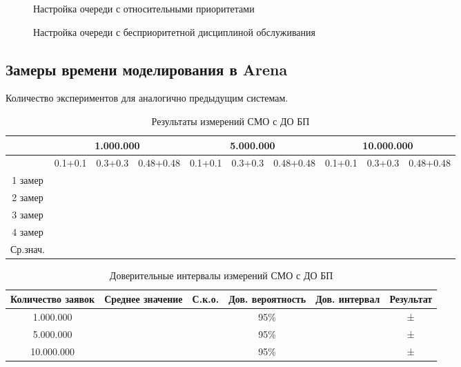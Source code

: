 \documentclass[a4paper,14pt]{report} %
\begin{document}
\begin{figure}[h] %
\caption{Настройка очереди с относительными приоритетами}
\label{ris:queue_pri}
\end{figure} %

\begin{figure}[h] %
\caption{Настройка очереди с бесприоритетной дисциплиной обслуживания}
\label{ris:queue}
\end{figure} %

\subsection{Замеры времени моделирования в Arena}
Количество экспериментов для аналогично предыдущим системам.

\begin{table}[h!]
\caption{Результаты измерений СМО с ДО БП}
\begin{tabular}{|c|c|c|c|c|c|c|c|c|c|}
\hline
 & \multicolumn{3}{|c|}{1.000.000} & \multicolumn{3}{|c|}{5.000.000} & \multicolumn{3}{|c|}{10.000.000} \\
\hline
 & 0.1+0.1 & 0.3+0.3 & 0.48+0.48 & 0.1+0.1 & 0.3+0.3 & 0.48+0.48 & 0.1+0.1 & 0.3+0.3 & 0.48+0.48 \\
\hline
1 замер &  &  &  &  &  &  &  &  &  \\
\hline
2 замер &  &  &  &  &  &  &  &  &  \\
\hline
3 замер &  &  &  &  &  &  &  &  &  \\
\hline
4 замер &  &  &  &  &  &  &  &  & \\
\hline
Ср.знач. &  &  &  &  &  &  &  &  &  \\
\hline
\end{tabular}
\end{table} 

\begin{table}[h!]
\caption{Доверительные интервалы измерений СМО с ДО БП}
\begin{tabular}{|c|c|c|c|c|c|}
\hline
 Количество заявок & Среднее значение & С.к.о. & Дов. вероятность & Дов. интервал & Результат\\
\hline
1.000.000 &  &  & 95\% &  &  ±  \\
\hline
5.000.000 &  &  & 95\% &  & ±  \\
\hline
10.000.000 &  &  & 95\% & &  ±  \\
\hline
\end{tabular}
\end{table} 
\end{document}
